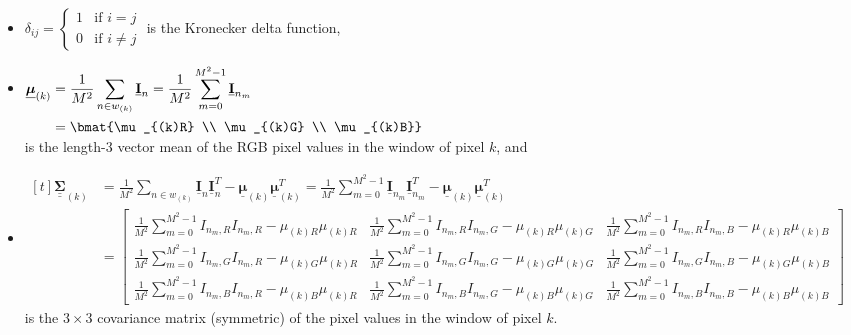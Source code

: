 \documentclass{article}
\def\vt#1{\underline{\mathbf{#1}}}
\def\vts#1{\underline{\boldsymbol{#1}}}
\def\mts#1{\underline{\underline{\boldsymbol{#1}}}}
\begin{document}
\begin{itemize}
    \item $\delta_{ij} = \begin{cases}
        1&\text{if $i=j$}\\
        0&\text{if $i\neq j$}
    \end{cases}$ is the Kronecker delta function,
    \item $\begin{aligned}[t]
        \vts \mu_{(k)} &= \frac1{M^2} \sum_{n\in w_{(k)}} \vt I_{n} = \frac1{M^2} \sum_{m=0}^{M^2-1} \vt I_{n_m} \\
        &= \bmat{\mu_{(k)R} \\ \mu_{(k)G} \\ \mu_{(k)B}}
    \end{aligned}$ \\
    is the length-$3$ vector mean of the RGB pixel values in the window of pixel $k$, and
    \item $\begin{aligned}[t]
        \mts \Sigma_{(k)}
        &= \frac1{M^2} \sum_{n\in w_{(k)}} \vt I_{n} \vt I_{n}^T  - \vts \mu_{(k)} \vts \mu_{(k)}^T = \frac1{M^2} \sum_{m=0}^{M^2-1} \vt I_{n_m} \vt I_{n_m}^T  - \vts \mu_{(k)} \vts \mu_{(k)}^T \\
        &= \left[\begin{smallmatrix}
            \frac1{M^2} \sum_{m=0}^{M^2-1} I_{n_m,R}I_{n_m,R} - \mu_{(k)R}\mu_{(k)R} & \frac1{M^2} \sum_{m=0}^{M^2-1} I_{n_m,R}I_{n_m,G} - \mu_{(k)R}\mu_{(k)G} & \frac1{M^2} \sum_{m=0}^{M^2-1} I_{n_m,R}I_{n_m,B} - \mu_{(k)R}\mu_{(k)B}\\
            \frac1{M^2} \sum_{m=0}^{M^2-1} I_{n_m,G}I_{n_m,R} - \mu_{(k)G}\mu_{(k)R} & \frac1{M^2} \sum_{m=0}^{M^2-1} I_{n_m,G}I_{n_m,G} - \mu_{(k)G}\mu_{(k)G} & \frac1{M^2} \sum_{m=0}^{M^2-1} I_{n_m,G}I_{n_m,B} - \mu_{(k)G}\mu_{(k)B}\\
            \frac1{M^2} \sum_{m=0}^{M^2-1} I_{n_m,B}I_{n_m,R} - \mu_{(k)B}\mu_{(k)R} & \frac1{M^2} \sum_{m=0}^{M^2-1} I_{n_m,B}I_{n_m,G} - \mu_{(k)B}\mu_{(k)G} & \frac1{M^2} \sum_{m=0}^{M^2-1} I_{n_m,B}I_{n_m,B} - \mu_{(k)B}\mu_{(k)B}
       \end{smallmatrix}\right]
    \end{aligned}$\\
    is the $3\times 3$ covariance matrix (symmetric) of the pixel values in the window of pixel $k$.
\end{itemize}
\end{document}
